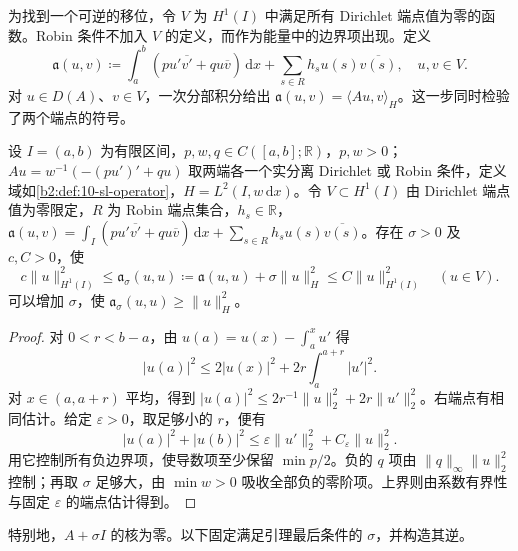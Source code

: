 \ProseParagraphBreak

为找到一个可逆的移位，令 \(V\) 为 \(H^1(I)\) 中满足所有 Dirichlet 端点值为零的函数。Robin 条件不加入 \(V\) 的定义，而作为能量中的边界项出现。定义
\begin{equation}\label{b2:eq:10-energy-form}
 \mathfrak a(u,v)\coloneqq
 \int_a^b\left(pu'\overline{v'}+qu\overline v\right)\,\mathrm{d}x
 +\sum_{s\in R}h_su(s)\overline{v(s)},
 \quad u,v\in V.
\end{equation}
对 \(u\in D(A)\)、\(v\in V\)，一次分部积分给出 \(\mathfrak a(u,v)=\langle Au,v\rangle_H\)。这一步同时检验了两个端点的符号。

\begin{lemma}[移位能量估计]\label{b2:lem:10-form-coercive}
设 \(I=(a,b)\) 为有限区间，\(p,w,q\in C([a,b];\mathbb R)\)，\(p,w>0\)；\(Au=w^{-1}(-(pu')'+qu)\) 取两端各一个实分离 Dirichlet 或 Robin 条件，定义域如\cref{b2:def:10-sl-operator}，\(H=L^2(I,w\,\mathrm dx)\)。令 \(V\subset H^1(I)\) 由 Dirichlet 端点值为零限定，\(R\) 为 Robin 端点集合，\(h_s\in\mathbb R\)，\(\mathfrak a(u,v)=\int_I(pu'\overline{v'}+qu\overline v)\,\mathrm dx+\sum_{s\in R}h_su(s)\overline{v(s)}\)。存在 \(\sigma>0\) 及 \(c,C>0\)，使
\[
 c\|u\|_{H^1(I)}^2
 \leq\mathfrak a_\sigma(u,u)
 \coloneqq\mathfrak a(u,u)+\sigma\|u\|_H^2
 \leq C\|u\|_{H^1(I)}^2
 \quad(u\in V).
\]
可以增加 \(\sigma\)，使 \(\mathfrak a_\sigma(u,u)\geq\|u\|_H^2\)。
\end{lemma}
\begin{proof}
对 \(0<r<b-a\)，由 \(u(a)=u(x)-\int_a^xu'\) 得
\[
 |u(a)|^2\leq2|u(x)|^2+2r\int_a^{a+r}|u'|^2.
\]
对 \(x\in(a,a+r)\) 平均，得到 \(|u(a)|^2\leq2r^{-1}\|u\|_2^2+2r\|u'\|_2^2\)。右端点有相同估计。给定 \(\varepsilon>0\)，取足够小的 \(r\)，便有
\[
 |u(a)|^2+|u(b)|^2
 \leq\varepsilon\|u'\|_2^2+C_\varepsilon\|u\|_2^2.
\]
用它控制所有负边界项，使导数项至少保留 \(\min p/2\)。负的 \(q\) 项由 \(\|q\|_\infty\|u\|_2^2\) 控制；再取 \(\sigma\) 足够大，由 \(\min w>0\) 吸收全部负的零阶项。上界则由系数有界性与固定 \(\varepsilon\) 的端点估计得到。
\end{proof}

特别地，\(A+\sigma I\) 的核为零。以下固定满足引理最后条件的 \(\sigma\)，并构造其逆。

